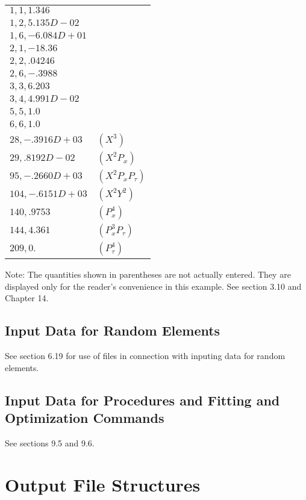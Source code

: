 \begin{center}
\begin{tabular}{ll}
         $1,1,1.346$             & \\
         $1,2,5.135D-02$         & \\
         $1,6,-6.084D+01$        & \\
         $2,1,-18.36$            & \\
         $2,2,.04246$            & \\
         $2,6,-.3988$            & \\
         $3,3,6.203$             & \\
         $3,4,4.991D-02$         & \\
         $5,5,1.0$               & \\
         $6,6,1.0$               & \\
         $28,-.3916D+03$         & $(X^3)$ \\
         $29,.8192D-02$          & $(X^2P_x)$ \\
         $95,-.2660D+03$         & $(X^2P_xP_{\tau})$ \\
         $104,-.6151D+03$        & $(X^2Y^2)$ \\
         $140,.9753$             & $(P^4_x)$ \\
         $144,4.361$             & $(P^3_xP_{\tau})$ \\
         $209,0.$                & $(P^4_{\tau})$
\end{tabular}
\end{center}
Note:  The quantities shown in parentheses are not actually entered.  They
are displayed only for the reader's convenience in this example.  See
section 3.10 and Chapter 14.

\subsection{Input Data for Random Elements}
     See section 6.19 for use of files in connection with inputing data for
random elements.

\subsection{Input Data for Procedures and Fitting and Optimization Commands}
     See sections 9.5 and 9.6.

\section{Output File Structures}
